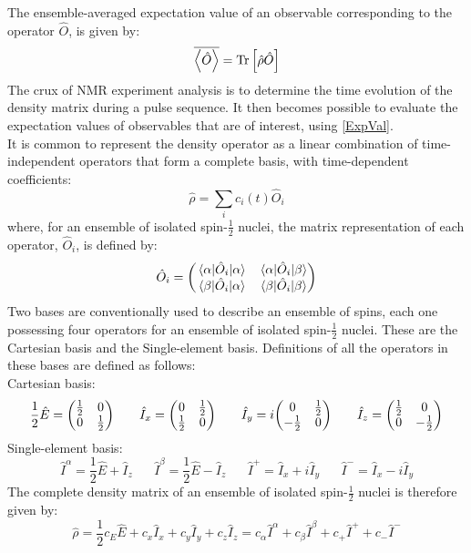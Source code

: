 The ensemble-averaged expectation value of an observable corresponding to the operator $\hat{O}$, is given by:
\begin{equation}
\label{ExpVal}
\overline{\expval{\hat{O}}} = \text{Tr}\left[{\hat{\rho}\hat{O}}\right]
\end{equation}
The crux of NMR experiment analysis is to determine the time evolution of the density matrix during a pulse sequence. It then becomes possible to evaluate the expectation values of observables that are of interest, using \ref{ExpVal}.\\
It is common to represent the density operator as a linear combination of time-independent operators that form a complete basis, with time-dependent coefficients:
\begin{equation}
\hat{\rho} = \sum \limits_i c_i (t) \hat{O}_i
\end{equation}
where, for an ensemble of isolated spin-$\frac{1}{2}$ nuclei, the matrix representation of each operator, $\hat{O}_i$, is defined by:
\begin{equation}
\hat{O}_i = \mqty(\mel{\alpha}{\hat{O}_i}{\alpha} & \mel{\alpha}{\hat{O}_i}{\beta} \\ \mel{\beta}{\hat{O}_i}{\alpha} & \mel{\beta}{\hat{O}_i}{\beta})
\end{equation}
Two bases are conventionally used to describe an ensemble of spins, each one possessing four operators for an ensemble of isolated spin-$\frac{1}{2}$ nuclei. These are the Cartesian basis and the Single-element basis. Definitions of all the operators in these bases are defined as follows:\\
Cartesian basis:
\begin{equation}
\frac{1}{2}\hat{E} = \mqty(\frac{1}{2} & 0 \\ 0 & \frac{1}{2}) \hspace{20pt} \hat{I}_x = \mqty(0 & \frac{1}{2} \\ \frac{1}{2} & 0) \hspace{20pt} \hat{I}_y = i\mqty(0 & \frac{1}{2} \\ -\frac{1}{2} & 0) \hspace{20pt} \hat{I}_z = \mqty(\frac{1}{2} & 0 \\ 0 & -\frac{1}{2})
\end{equation}
Single-element basis:
\begin{equation}
\hat{I}^{\alpha} = \frac{1}{2} \hat{E} + \hat{I}_z \hspace{20pt} \hat{I}^{\beta} = \frac{1}{2} \hat{E} - \hat{I}_z \hspace{20pt} \hat{I}^+ = \hat{I}_x + i\hat{I}_y \hspace{20pt} \hat{I}^- = \hat{I}_x - i\hat{I}_y 
\end{equation}
The complete density matrix of an ensemble of isolated spin-$\frac{1}{2}$ nuclei is therefore given by:
\begin{equation}
\hat{\rho} = \frac{1}{2} c_E \hat{E} + c_x \hat{I}_x + c_y \hat{I}_y + c_z \hat{I}_z = c_{\alpha} \hat{I}^{\alpha} + c_{\beta} \hat{I}^{\beta} + c_+ \hat{I}^+ + c_- \hat{I}^-
\end{equation} 
